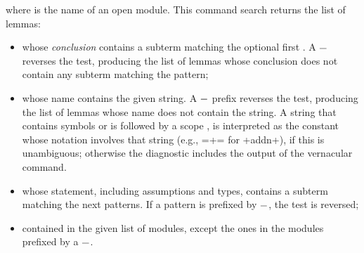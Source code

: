 where  is the name of an open module.
This command search returns the list of lemmas:
\begin{itemize}
\item whose \emph{conclusion} contains a subterm matching the optional
  first . A $\ssrC{-}$ reverses the test, producing the list
  of lemmas whose conclusion does not contain any subterm matching
  the pattern;
\item whose name contains the given string. A $\ssrC{-}$ prefix reverses
  the test, producing the list of lemmas whose name does not contain the
  string. A string that contains symbols or
is followed by a scope , is interpreted as the constant whose
notation involves that string (e.g., \ssrL=+= for \ssrL+addn+), if this is
unambiguous; otherwise the diagnostic includes the output of the
 vernacular command.

\item whose statement, including assumptions and types, contains a
  subterm matching the next patterns. If a pattern is prefixed by
  $\ssrC{-}$, the test is reversed;
\item contained in the given list of modules, except the ones in the
  modules prefixed by a $\ssrC{-}$.
\end{itemize}

